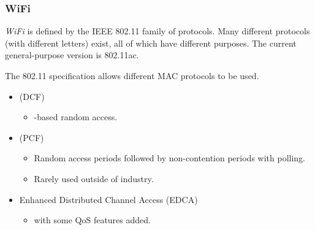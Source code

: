 \subsubsection{WiFi}\label{subsubsec:WiFi}
\begin{definition}[WiFi]\label{def:WiFi}
  \emph{WiFi} is defined by the IEEE 802.11 family of protocols.
  Many different protocols (with different letters) exist, all of which have different purposes.
  The current general-purpose version is 802.11ac.

  The 802.11 specification allows different MAC protocols to be used.
  \begin{itemize}[noitemsep]
  \item {} (DCF)
    \begin{itemize}[noitemsep]
    \item {}-based random access.
    \end{itemize}

  \item {} (PCF)
    \begin{itemize}[noitemsep]
    \item Random access periods followed by non-contention periods with polling.
    \item Rarely used outside of industry.
    \end{itemize}

  \item Enhanced Distributed Channel Access (EDCA)
    \begin{itemize}[noitemsep]
    \item {} with some QoS features added.
    \end{itemize}
  \end{itemize}
\end{definition}

